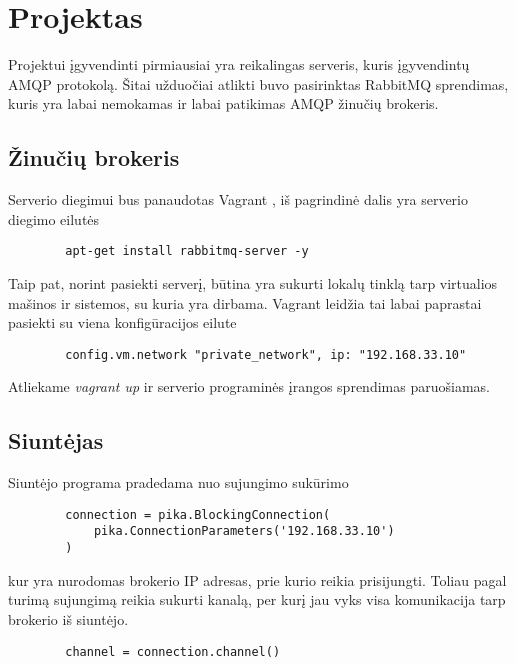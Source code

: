 \documentclass[12pt, a4paper, lithuanian]{article}
\begin{document}
    \section{Projektas}

    Projektui įgyvendinti pirmiausiai yra reikalingas serveris, kuris įgyvendintų AMQP protokolą.
    Šitai užduočiai atlikti buvo pasirinktas RabbitMQ \cite{RabbitMQ71:online} sprendimas, kuris yra labai nemokamas ir labai patikimas AMQP žinučių brokeris.

    \subsection{Žinučių brokeris}

    Serverio diegimui bus panaudotas Vagrant \cite{Vagrantb88:online}, iš pagrindinė dalis yra serverio diegimo eilutės

    \begin{lstlisting}
        apt-get install rabbitmq-server -y
    \end{lstlisting}

    Taip pat, norint pasiekti serverį, būtina yra sukurti lokalų tinklą tarp virtualios mašinos ir sistemos, su kuria yra dirbama.
    Vagrant leidžia tai labai paprastai pasiekti su viena konfigūracijos eilute

    \begin{lstlisting}
        config.vm.network "private_network", ip: "192.168.33.10"
    \end{lstlisting}

    Atliekame \textit{vagrant up} ir serverio programinės įrangos sprendimas paruošiamas.

    \subsection{Siuntėjas}

    Siuntėjo programa pradedama nuo sujungimo sukūrimo

    \begin{lstlisting}
        connection = pika.BlockingConnection(
            pika.ConnectionParameters('192.168.33.10')
        )
    \end{lstlisting}
    kur yra nurodomas brokerio IP adresas, prie kurio reikia prisijungti.
    Toliau pagal turimą sujungimą reikia sukurti kanalą, per kurį jau vyks visa komunikacija tarp brokerio iš siuntėjo.

    \begin{lstlisting}
        channel = connection.channel()
    \end{lstlisting}
\end{document}
